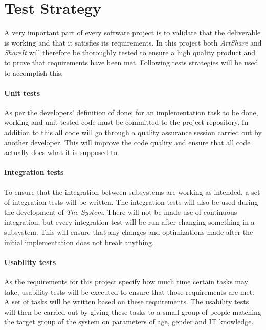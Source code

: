 \documentclass[../report.tex]{subfiles}
\begin{document}
\graphicspath{{img/}{../img/}}

\section{Test Strategy}

A very important part of every software project is to validate that the deliverable is working and that it satisfies its requirements. In this project both \textit{ArtShare} and \textit{ShareIt} will therefore be thoroughly tested to ensure a high quality product and to prove that requirements have been met. Following tests strategies will be used to accomplish this:

\paragraph{Unit tests}
As per the developers' definition of done; for an implementation task to be done, working and unit-tested code must be committed to the project repository. In addition to this all code will go through a quality assurance session carried out by another developer. This will improve the code quality and ensure that all code actually does what it is supposed to.

\paragraph{Integration tests}

To ensure that the integration between subsystems are working as intended, a set of integration tests will be written. The integration tests will also be used during the development of \textit{The System}. There will not be made use of continuous integration, but every integration test will be run after changing something in a subsystem. This will ensure that any changes and optimizations made after the initial implementation does not break anything.

\paragraph{Usability tests}
As the requirements for this project specify how much time certain tasks may take, usability tests will be executed to ensure that those requirements are met. A set of tasks will be written based on these requirements. The usability tests will then be carried out by giving these tasks to a small group of people matching the target group of the system on parameters of age, gender and IT knowledge.
\end{document}

